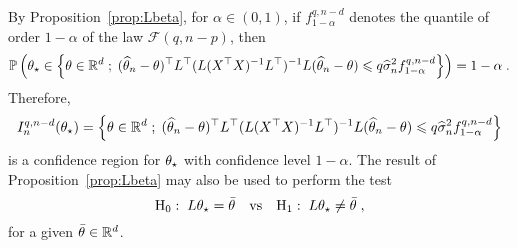 By Proposition~\ref{prop:Lbeta}, for $\alpha\in(0,1)$, if $f_{1-\alpha}^{q,n-d}$ denotes the quantile of order $1-\alpha$ of the law $\mathcal{F}(q,n-p)$, then 
\[
\mathbb{P}\left(\theta_{\star}\in \left\{\theta\in\mathbb{R}^d\;;\; (\widehat {\theta}_{n} -\theta)^\top L^\top(L(X^\top X)^{-1}L^\top)^{-1}L(\widehat {\theta}_{n} -\theta)\leqslant q\widehat\sigma^2_{n}f_{1-\alpha}^{q,n-d}\right\}\right) = 1-\alpha\;.
\]
Therefore, 
\[
I^{q,n-d}_{n}(\theta_{\star}) = \left\{\theta\in\mathbb{R}^d\;;\; (\widehat {\theta}_{n} -\theta)^\top L^\top(L(X^\top X)^{-1}L^\top)^{-1}L(\widehat {\theta}_{n} -\theta)\leqslant q\widehat\sigma^2_{n}f_{1-\alpha}^{q,n-d}\right\}
\]
 is a confidence region for $\theta_{\star}$ with confidence level $1-\alpha$. The result of Proposition~\ref{prop:Lbeta} may also be used to perform the test 
\[
\mathrm{H}_0:\; L\theta_{\star} = \bar{\theta} \quad\mathrm{vs} \quad \mathrm{H}_1:\; L\theta_{\star} \neq \bar {\theta}\;,
\]
for a given $\bar {\theta} \in\mathbb{R}^d$.






